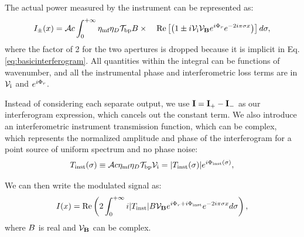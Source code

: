 
The actual power measured by the instrument can be represented as:
\begin{equation}
I_\pm(x) = \mathcal{A} c\int_0^{+\infty} \eta_\textrm{mf}\eta_D\mathcal{T}_\textrm{bp} B \times
 \quad  \textrm{Re} \left[\left(1\pm i \mathcal{V}_\textrm{i}\mathcal{V}_{\mathbf{B}} e^{i\Phi_r} e^{-2i\pi \sigma x}\right) \right]d\sigma,
\end{equation}
where the factor of 2 for the two apertures is dropped because it is implicit in Eq. \ref{eq:basicinterferogram}. All quantities within the integral can be functions of wavenumber, and all the instrumental phase and interferometric loss terms are in $\mathcal{V}_\textrm{i}$ and $e^{i\Phi_r}$.

Instead of considering each separate output, we use $\textrm{\textbf{I}} = \textrm{\textbf{I}}_+ - \textrm{\textbf{I}}_-$ as our interferogram expression, which cancels out the constant term. We also introduce an interferometric instrument transmission function, which can be complex, which represents the normalized amplitude and phase of the interferogram for a point source of uniform spectrum and no phase noise:
\begin{equation}
T_{\textrm{inst}}(\sigma) \equiv \mathcal{A} c\eta_\textrm{mf}\eta_D\mathcal{T}_\textrm{bp} \mathcal{V}_\textrm{i} = |T_{\textrm{inst}}(\sigma)|e^{i\Phi_{\textrm{inst}}(\sigma)},
\end{equation}

 We can then write the modulated signal as:
\begin{equation}
I(x) = \textrm{Re}\left( 2\int_{0}^{+\infty} i |T_{\textrm{inst}}| B \mathcal{V}_{\mathbf{B}} e^{i\Phi_r + i\Phi_{\textrm{inst}}} e^{-2i\pi \sigma x}d\sigma \right),
\label{eq:modsignal}
\end{equation}
where $B$ is real and $\mathcal{V}_{\mathbf{B}}$ can be complex.

